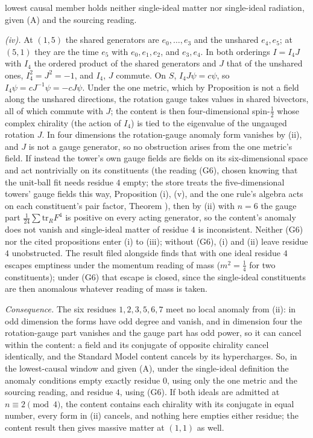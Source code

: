lowest causal member holds neither single-ideal matter nor single-ideal radiation, given (A) and the sourcing reading.

\emph{(iv).} At $(1,5)$ the shared generators are $e_{0}, \ldots, e_{3}$ and the unshared $e_{4}, e_{5}$; at $(5,1)$ they are the time $e_{5}$ with $e_{0}, e_{1}, e_{2}$, and $e_{3}, e_{4}$. In both orderings $I = I_{4}J$ with $I_{4}$ the ordered product of the shared generators and $J$ that of the unshared ones, $I_{4}^{2} = J^{2} = -1$, and $I_{4}$, $J$ commute. On $S$, $I_{4}J\psi = c\psi$, so $I_{4}\psi = cJ^{-1}\psi = -cJ\psi$. Under the one metric, which by Proposition  is not a field along the unshared directions, the rotation gauge takes values in shared bivectors, all of which commute with $J$; the content is then four-dimensional spin-$\tfrac12$ whose complex chirality (the action of $I_{4}$) is tied to the eigenvalue of the ungauged rotation $J$. In four dimensions the rotation-gauge anomaly form vanishes by (ii), and $J$ is not a gauge generator, so no obstruction arises from the one metric's field. If instead the tower's own gauge fields are fields on its six-dimensional space and act nontrivially on its constituents (the reading (G6), chosen knowing that the unit-ball fit needs residue $4$ empty; the store treats the five-dimensional towers' gauge fields this way, Proposition (i), (v), and the one rule's algebra acts on each constituent's pair factor, Theorem ), then by (ii) with $n = 6$ the gauge part $\tfrac{1}{24}\sum\mathrm{tr}_{R}F^{4}$ is positive on every acting generator, so the content's anomaly does not vanish and single-ideal matter of residue $4$ is inconsistent. Neither (G6) nor the cited propositions enter (i) to (iii); without (G6), (i) and (ii) leave residue $4$ unobstructed. The result filed alongside finds that with one ideal residue $4$ escapes emptiness under the momentum reading of mass ($m^{2} = \tfrac14$ for two constituents); under (G6) that escape is closed, since the single-ideal constituents are then anomalous whatever reading of mass is taken.

\emph{Consequence.} The six residues $1, 2, 3, 5, 6, 7$ meet no local anomaly from (ii): in odd dimension the forms have odd degree and vanish, and in dimension four the rotation-gauge part vanishes and the gauge part has odd power, so it can cancel within the content: a field and its conjugate of opposite chirality cancel identically, and the Standard Model content cancels by its hypercharges. So, in the lowest-causal window and given (A), under the single-ideal definition the anomaly conditions empty exactly residue $0$, using only the one metric and the sourcing reading, and residue $4$, using (G6). If both ideals are admitted at $n \equiv 2 \pmod 4$, the content contains each chirality with its conjugate in equal number, every form in (ii) cancels, and nothing here empties either residue; the content result then gives massive matter at $(1,1)$ as well.
